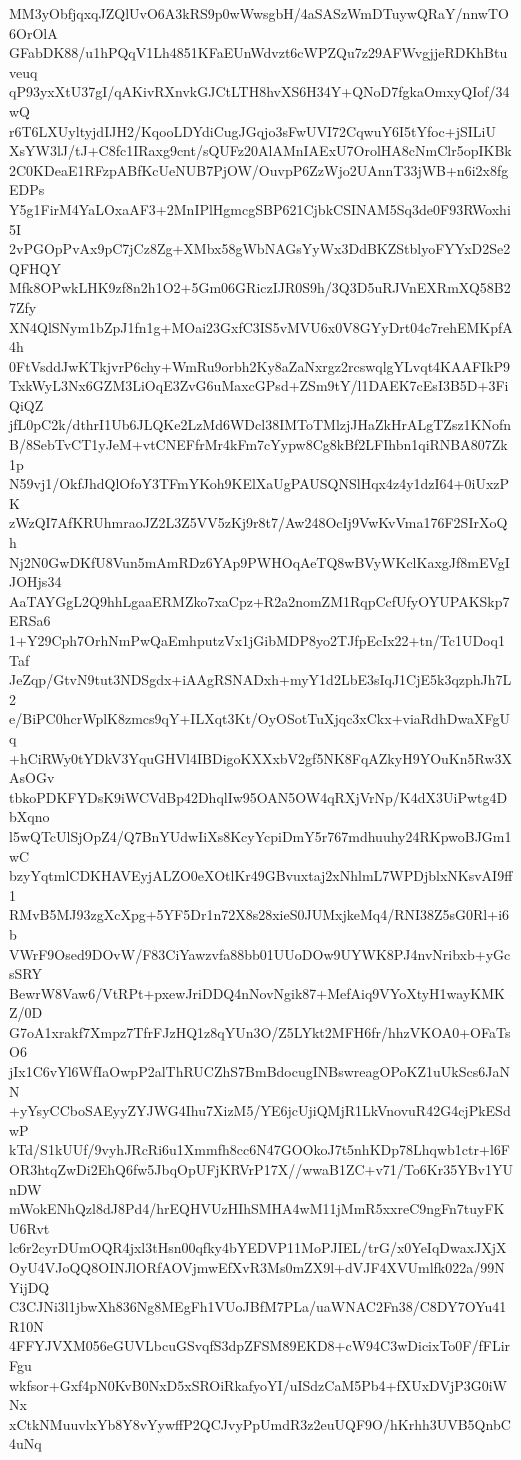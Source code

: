 MM3yObfjqxqJZQlUvO6A3kRS9p0wWwsgbH/4aSASzWmDTuywQRaY/nnwTO6OrOlA
GFabDK88/u1hPQqV1Lh4851KFaEUnWdvzt6cWPZQu7z29AFWvgjjeRDKhBtuveuq
qP93yxXtU37gI/qAKivRXnvkGJCtLTH8hvXS6H34Y+QNoD7fgkaOmxyQIof/34wQ
r6T6LXUyltyjdIJH2/KqooLDYdiCugJGqjo3sFwUVI72CqwuY6I5tYfoc+jSILiU
XsYW3lJ/tJ+C8fc1IRaxg9cnt/sQUFz20AlAMnIAExU7OrolHA8cNmClr5opIKBk
2C0KDeaE1RFzpABfKcUeNUB7PjOW/OuvpP6ZzWjo2UAnnT33jWB+n6i2x8fgEDPs
Y5g1FirM4YaLOxaAF3+2MnIPlHgmcgSBP621CjbkCSINAM5Sq3de0F93RWoxhi5I
2vPGOpPvAx9pC7jCz8Zg+XMbx58gWbNAGsYyWx3DdBKZStblyoFYYxD2Se2QFHQY
Mfk8OPwkLHK9zf8n2h1O2+5Gm06GRiczIJR0S9h/3Q3D5uRJVnEXRmXQ58B27Zfy
XN4QlSNym1bZpJ1fn1g+MOai23GxfC3IS5vMVU6x0V8GYyDrt04c7rehEMKpfA4h
0FtVsddJwKTkjvrP6chy+WmRu9orbh2Ky8aZaNxrgz2rcswqlgYLvqt4KAAFIkP9
TxkWyL3Nx6GZM3LiOqE3ZvG6uMaxcGPsd+ZSm9tY/l1DAEK7cEsI3B5D+3FiQiQZ
jfL0pC2k/dthrI1Ub6JLQKe2LzMd6WDcl38IMToTMlzjJHaZkHrALgTZsz1KNofn
B/8SebTvCT1yJeM+vtCNEFfrMr4kFm7cYypw8Cg8kBf2LFIhbn1qiRNBA807Zk1p
N59vj1/OkfJhdQlOfoY3TFmYKoh9KElXaUgPAUSQNSlHqx4z4y1dzI64+0iUxzPK
zWzQI7AfKRUhmraoJZ2L3Z5VV5zKj9r8t7/Aw248OcIj9VwKvVma176F2SIrXoQh
Nj2N0GwDKfU8Vun5mAmRDz6YAp9PWHOqAeTQ8wBVyWKclKaxgJf8mEVgIJOHjs34
AaTAYGgL2Q9hhLgaaERMZko7xaCpz+R2a2nomZM1RqpCcfUfyOYUPAKSkp7ERSa6
1+Y29Cph7OrhNmPwQaEmhputzVx1jGibMDP8yo2TJfpEcIx22+tn/Tc1UDoq1Taf
JeZqp/GtvN9tut3NDSgdx+iAAgRSNADxh+myY1d2LbE3sIqJ1CjE5k3qzphJh7L2
e/BiPC0hcrWplK8zmcs9qY+ILXqt3Kt/OyOSotTuXjqc3xCkx+viaRdhDwaXFgUq
+hCiRWy0tYDkV3YquGHVl4IBDigoKXXxbV2gf5NK8FqAZkyH9YOuKn5Rw3XAsOGv
tbkoPDKFYDsK9iWCVdBp42DhqlIw95OAN5OW4qRXjVrNp/K4dX3UiPwtg4DbXqno
l5wQTcUlSjOpZ4/Q7BnYUdwIiXs8KcyYcpiDmY5r767mdhuuhy24RKpwoBJGm1wC
bzyYqtmlCDKHAVEyjALZO0eXOtlKr49GBvuxtaj2xNhlmL7WPDjblxNKsvAI9ff1
RMvB5MJ93zgXcXpg+5YF5Dr1n72X8s28xieS0JUMxjkeMq4/RNI38Z5sG0Rl+i6b
VWrF9Osed9DOvW/F83CiYawzvfa88bb01UUoDOw9UYWK8PJ4nvNribxb+yGcsSRY
BewrW8Vaw6/VtRPt+pxewJriDDQ4nNovNgik87+MefAiq9VYoXtyH1wayKMKZ/0D
G7oA1xrakf7Xmpz7TfrFJzHQ1z8qYUn3O/Z5LYkt2MFH6fr/hhzVKOA0+OFaTsO6
jIx1C6vYl6WfIaOwpP2alThRUCZhS7BmBdocugINBswreagOPoKZ1uUkScs6JaNN
+yYsyCCboSAEyyZYJWG4Ihu7XizM5/YE6jcUjiQMjR1LkVnovuR42G4cjPkESdwP
kTd/S1kUUf/9vyhJRcRi6u1Xmmfh8cc6N47GOOkoJ7t5nhKDp78Lhqwb1ctr+l6F
OR3htqZwDi2EhQ6fw5JbqOpUFjKRVrP17X//wwaB1ZC+v71/To6Kr35YBv1YUnDW
mWokENhQzl8dJ8Pd4/hrEQHVUzHIhSMHA4wM11jMmR5xxreC9ngFn7tuyFKU6Rvt
lc6r2cyrDUmOQR4jxl3tHsn00qfky4bYEDVP11MoPJIEL/trG/x0YeIqDwaxJXjX
OyU4VJoQQ8OINJlORfAOVjmwEfXvR3Ms0mZX9l+dVJF4XVUmlfk022a/99NYijDQ
C3CJNi3l1jbwXh836Ng8MEgFh1VUoJBfM7PLa/uaWNAC2Fn38/C8DY7OYu41R10N
4FFYJVXM056eGUVLbcuGSvqfS3dpZFSM89EKD8+cW94C3wDicixTo0F/fFLirFgu
wkfsor+Gxf4pN0KvB0NxD5xSROiRkafyoYI/uISdzCaM5Pb4+fXUxDVjP3G0iWNx
xCtkNMuuvlxYb8Y8vYywffP2QCJvyPpUmdR3z2euUQF9O/hKrhh3UVB5QnbC4uNq
